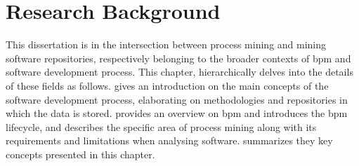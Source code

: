 \chapter{Research Background}


This dissertation is in the intersection between process mining and mining software repositories, respectively belonging to the broader contexts of \gls{bpm} and software development process. This chapter, hierarchically delves into the details of these fields as follows.  gives an introduction on the main concepts of the software development process, elaborating on methodologies and repositories in which the data is stored.
 provides an overview on \gls{bpm} and introduces the \gls{bpm} lifecycle, and describes the specific area of process mining along with its requirements and limitations when analysing software.  summarizes they key concepts presented in this chapter. 

 


